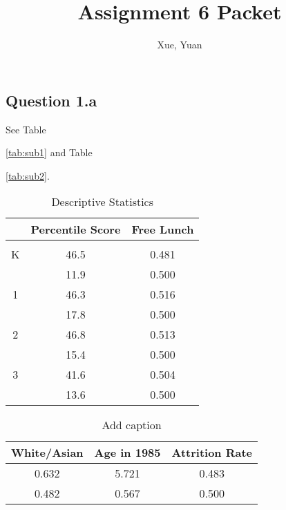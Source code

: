\documentclass{article}
\author{Xue, Yuan}
\title{Assignment 6 Packet}
\begin{document}
\maketitle

\subsection*{Question 1.a}

See Table {\ref{tab:sub1} and Table {\ref{tab:sub2}.

\begin{table}[htbp]
  \centering
  \caption{Descriptive Statistics}
    \label{tab:sub1}
    \begin{tabular}{rcc}
    \toprule
          & Percentile Score & Free Lunch \\
    \midrule
          &       &  \\
    \multicolumn{1}{c}{K} & 46.5  & 0.481  \\
          & 11.9  & 0.500  \\
    \multicolumn{1}{c}{1} & 46.3  & 0.516  \\
          & 17.8  & 0.500  \\
    \multicolumn{1}{c}{2} & 46.8  & 0.513  \\
          & 15.4  & 0.500  \\
    \multicolumn{1}{c}{3} & 41.6  & 0.504  \\
          & 13.6  & 0.500  \\
    \bottomrule
    \bottomrule
    \end{tabular}%
  \label{tab:addlabel}%
\end{table}%



\begin{table}[htbp]
  \centering
  \caption{Add caption}
  \label{tab:sub2}
    \begin{tabular}{ccc}
    \toprule
    \multicolumn{1}{l}{White/Asian} & \multicolumn{1}{l}{Age in 1985} & \multicolumn{1}{l}{Attrition Rate} \\
    \midrule
    0.632  & 5.721  & 0.483  \\
    0.482  & 0.567  & 0.500  \\
    \bottomrule
    \bottomrule
    \end{tabular}%
  \label{tab:addlabel}%
\end{table}%



}}
\end{document}
